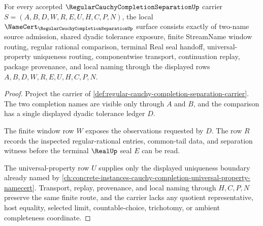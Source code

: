 \begin{theorem}
\label{thm:regular-cauchy-completion-separation-namecert-obligations}
For every accepted $\RegularCauchyCompletionSeparationUp$ carrier $S=(A,B,D,W,R,E,U,H,C,P,N)$, the local $\NameCert_{\RegularCauchyCompletionSeparationUp}$ surface consists exactly of two-name source admission, shared dyadic tolerance exposure, finite StreamName window routing, regular rational comparison, terminal Real seal handoff, universal-property uniqueness routing, componentwise transport, continuation replay, package provenance, and local naming through the displayed rows $A,B,D,W,R,E,U,H,C,P,N$.
\end{theorem}
\begin{proof}
Project the carrier of \autoref{def:regular-cauchy-completion-separation-carrier}. The two completion names are visible only through $A$ and $B$, and the comparison has a single displayed dyadic tolerance ledger $D$.

The finite window row $W$ exposes the observations requested by $D$. The row $R$ records the inspected regular-rational entries, common-tail data, and separation witness before the terminal $\RealUp$ seal $E$ can be read.

The universal-property row $U$ supplies only the displayed uniqueness boundary already named by \autoref{ch:concrete-instances-cauchy-completion-universal-property-namecert}. Transport, replay, provenance, and local naming through $H,C,P,N$ preserve the same finite route, and the carrier lacks any quotient representative, host equality, selected limit, countable-choice, trichotomy, or ambient completeness coordinate.
\end{proof}

